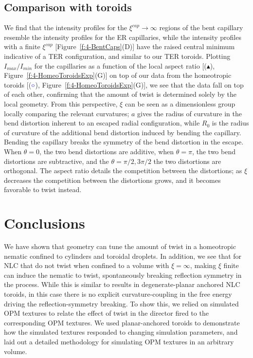 \subsection{Comparison with toroids}
We find that the intensity profiles for the $\xi^{cap} \rightarrow \infty$ regions of the bent capillary resemble the intensity profiles for the ER capillaries, while the intensity profiles with a finite $\xi^{cap}$ [Figure~\ref{f:4-BentCaps}(D)] have the raised central minimum indicative of a TER configuration, and similar to our TER toroids.
Plotting $I_{max}/I_{min}$ for the capillaries as a function of the local aspect ratio [($\blacktriangle$), Figure~\ref{f:4-HomeoToroidsExp}(G)] on top of our data from the homeotropic toroids [(${\color{blue} \circ}$), Figure~\ref{f:4-HomeoToroidsExp}(G)], we see that the data fall on top of each other, confirming that the amount of twist is determined solely by the local geometry.
From this perspective, $\xi$ can be seen as a dimensionless group locally comparing the relevant curvatures; $a$ gives the radius of curvature in the bend distortion inherent to an escaped radial configuration, while $R_0$ is the radius of curvature of the additional bend distortion induced by bending the capillary.
Bending the capillary breaks the symmetry of the bend distortion in the escape.
When $\theta = 0$, the two bend distortions are additive, when $\theta = \pi$, the two bend distortions are subtractive, and the $\theta = \pi/2,3\pi/2$ the two distortions are orthogonal.
The aspect ratio details the competition between the distortions; as $\xi$ decreases the competition between the distortions grows, and it becomes favorable to twist instead.


\section{Conclusions}
We have shown that geometry can tune the amount of twist in a homeotropic nematic confined to cylinders and toroidal droplets.
In addition, we see that for NLC that do not twist when confined to a volume with $\xi = \infty$, making $\xi$ finite can induce the nematic to twist, spontaneously breaking reflection symmetry in the process.
While this is similar to results in degenerate-planar anchored NLC toroids, in this case there is no explicit curvature-coupling in the free energy driving the reflection-symmetry breaking.
To show this, we relied on simulated OPM textures to relate the effect of twist in the director fired to the corresponding OPM textures.
We used planar-anchored toroids to demonstrate how the simulated textures responded to changing simulation parameters, and laid out a detailed methodology for simulating OPM textures in an arbitrary volume.

